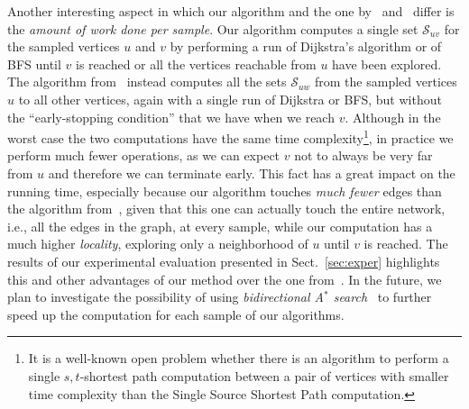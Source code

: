 Another interesting aspect in which our algorithm and the one
by~\citet{JacobKLPT05} and~\citet{BrandesP07} differ is the \emph{amount of work
done per sample}. Our algorithm computes a single set $\mathcal{S}_{uv}$ for the
sampled vertices $u$ and $v$ by performing a run of Dijkstra's algorithm or of
BFS until $v$ is reached or all the vertices reachable from $u$ have been
explored. The algorithm from~\citep{JacobKLPT05,BrandesP07} instead computes
all the sets $\mathcal{S}_{uw}$ from the sampled vertices $u$ to all other
vertices, again with a single run of Dijkstra or BFS, but without the
``early-stopping condition'' that we have when we reach $v$. Although in the
worst case the two computations have the same time complexity\footnote{It is a
well-known open problem whether there is an algorithm to perform a single
$s,t$-shortest path computation between a pair of vertices with smaller time
complexity than the Single Source Shortest Path computation.}, in practice we
perform much fewer operations, as we can expect $v$ not to always be very
far from $u$ and therefore we can terminate early. This fact has a great
impact on the running time, especially because our algorithm touches
\emph{much fewer} edges than the algorithm from~\citep{JacobKLPT05,BrandesP07},
given that this one can actually touch the entire network, i.e., all the edges
in the graph, at every sample, while our computation has a much higher
\emph{locality}, exploring only a neighborhood of $u$ until $v$ is reached. The
results of our experimental evaluation presented in Sect.~\ref{sec:exper}
highlights this and other advantages of our method over the one
from~\citep{JacobKLPT05,BrandesP07}. In the future, we plan to investigate the
possibility of using \emph{bidirectional A$^*$
search}~\citep{Pohl69,KaindlK97} to further speed up the computation for each
sample of our algorithms.

